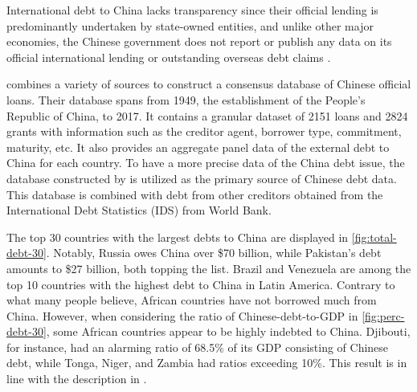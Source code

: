 International debt to China lacks transparency since their official lending is predominantly undertaken by state-owned entities, and unlike other major economies, the Chinese government does not report or publish any data on its official international lending or outstanding overseas debt claims \citep*{Horn-Reinhart-Trebesch-21}.


\citet*{Horn-Reinhart-Trebesch-21} combines a variety of sources to construct a consensus database of Chinese official loans.
Their database spans from 1949, the establishment of the People's Republic of China, to 2017. It contains a granular dataset of 2151 loans and 2824 grants with information such as the creditor agent, borrower type, commitment, maturity, etc. It also provides an aggregate panel data of the external debt to China for each country.
To have a more precise data of the China debt issue, the database constructed by \citet*{Horn-Reinhart-Trebesch-21} is utilized as the primary source of Chinese debt data. This database is combined with debt from other creditors obtained from the International Debt Statistics (IDS) from World Bank.

The top 30 countries with the largest debts to China are displayed in \autoref{fig:total-debt-30}. Notably, Russia owes China over \$70 billion, while Pakistan's debt amounts to \$27 billion, both topping the list. Brazil and Venezuela are among the top 10 countries with the highest debt to China in Latin America. Contrary to what many people believe, African countries have not borrowed much from China. However, when considering the ratio of Chinese-debt-to-GDP in \autoref{fig:perc-debt-30}, some African countries appear to be highly indebted to China. Djibouti, for instance, had an alarming ratio of 68.5\% of its GDP consisting of Chinese debt, while Tonga, Niger, and Zambia had ratios exceeding 10\%. This result is in line with the description in \citet{Eom-18}.

